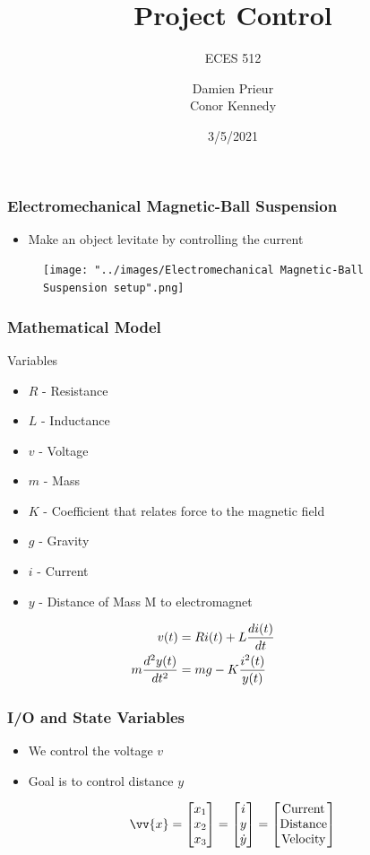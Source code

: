 \documentclass{beamer}
\title{Project Control}
\subtitle{ECES 512}
\author{Damien Prieur \\ Conor Kennedy}
\date{3/5/2021}
\begin{document}
\frame{\titlepage}

\begin{frame}
\frametitle{Electromechanical Magnetic-Ball Suspension}
\begin{itemize}[$\bullet$]
\item Make an object levitate by controlling the current
\end{itemize}
\begin{figure}
\texttt{[image: "../images/Electromechanical Magnetic-Ball Suspension setup".png]}
\end{figure}
\end{frame}

\begin{frame}
\frametitle{Mathematical Model}
Variables
\begin{itemize}
\item $R$ - Resistance
\item $L$ - Inductance
\item $v$ - Voltage
\item $m$ - Mass
\item $K$ - Coefficient that relates force to the magnetic field
\item $g$ - Gravity
\item $i$ - Current
\item $y$ - Distance of Mass M to electromagnet
\end{itemize}
$$
\begin{aligned}
    &\begin{aligned}
        \mathllap{v(t)} &= Ri(t) + L\frac{di(t)}{dt}
    \end{aligned} \\
    &\begin{aligned}
        \mathllap{m\frac{d^2y(t)}{dt^2}} &= mg - K\frac{i^2(t)}{y(t)}
    \end{aligned} \\
\end{aligned}
$$
\end{frame}

\begin{frame}
\frametitle{I/O and State Variables}
\begin{itemize}[$\bullet$]
\item We control the voltage $v$
\item Goal is to control distance $y$
\end{itemize}
$$
\vv{x}=
\begin{bmatrix}
x_1 \\
x_2 \\
x_3
\end{bmatrix}
=
\begin{bmatrix}
i \\
y \\
\dot{y}
\end{bmatrix}
=
\begin{bmatrix}
\text{Current} \\
\text{Distance}\\
\text{Velocity}
\end{bmatrix}
$$

\end{frame}
\end{document}
